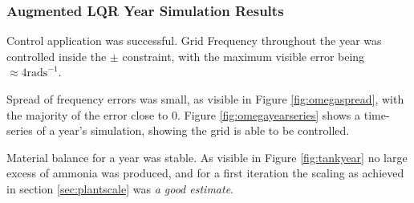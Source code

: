 \subsubsection{Augmented LQR Year Simulation Results}

Control application was successful.
Grid Frequency throughout the year was controlled inside the $\pm$ constraint, with the maximum visible error being $\approx 4 \text{rads}^{-1}$.

Spread of frequency errors was small, as visible in Figure \ref{fig:omegaspread}, with the majority of the error close to 0.
Figure \ref{fig:omegayearseries} shows a time-series of a year's simulation, showing the grid is able to be controlled.

Material balance for a year was stable.
As visible in Figure \ref{fig:tankyear} no large excess of ammonia was produced, and for a first iteration the scaling as achieved in section \ref{sec:plantscale} was \emph{a good estimate}.






